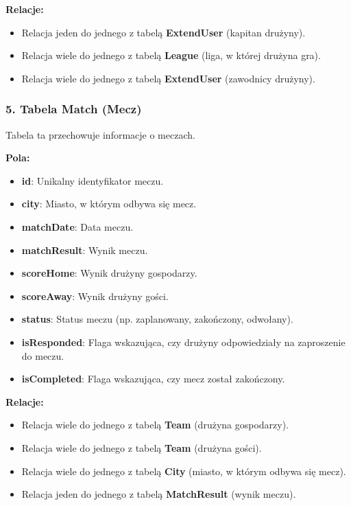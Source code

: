\documentclass[wmii,inf,inz]{uwmthesis} %
\newenvironment{indenteditemize}
{\begin{itemize}[left=1cm]} %
{\end{itemize}}
\begin{document}
\textbf{Relacje:}
\begin{indenteditemize}
    \item Relacja jeden do jednego z tabelą \textbf{ExtendUser} (kapitan drużyny).
    \item Relacja wiele do jednego z tabelą \textbf{League} (liga, w której drużyna gra).
    \item Relacja wiele do jednego z tabelą \textbf{ExtendUser} (zawodnicy drużyny).
\end{indenteditemize}

\subsubsection{5. Tabela Match (Mecz)}
Tabela ta przechowuje informacje o meczach.

\textbf{Pola:}
\begin{indenteditemize}
    \item \textbf{id}: Unikalny identyfikator meczu.
    \item \textbf{city}: Miasto, w którym odbywa się mecz.
    \item \textbf{matchDate}: Data meczu.
    \item \textbf{matchResult}: Wynik meczu.
    \item \textbf{scoreHome}: Wynik drużyny gospodarzy.
    \item \textbf{scoreAway}: Wynik drużyny gości.
    \item \textbf{status}: Status meczu (np. zaplanowany, zakończony, odwołany).
    \item \textbf{isResponded}: Flaga wskazująca, czy drużyny odpowiedziały na zaproszenie do meczu.
    \item \textbf{isCompleted}: Flaga wskazująca, czy mecz został zakończony.
\end{indenteditemize}

\textbf{Relacje:}
\begin{indenteditemize}
    \item Relacja wiele do jednego z tabelą \textbf{Team} (drużyna gospodarzy).
    \item Relacja wiele do jednego z tabelą \textbf{Team} (drużyna gości).
    \item Relacja wiele do jednego z tabelą \textbf{City} (miasto, w którym odbywa się mecz).
    \item Relacja jeden do jednego z tabelą \textbf{MatchResult} (wynik meczu).
\end{indenteditemize}
\end{document}
